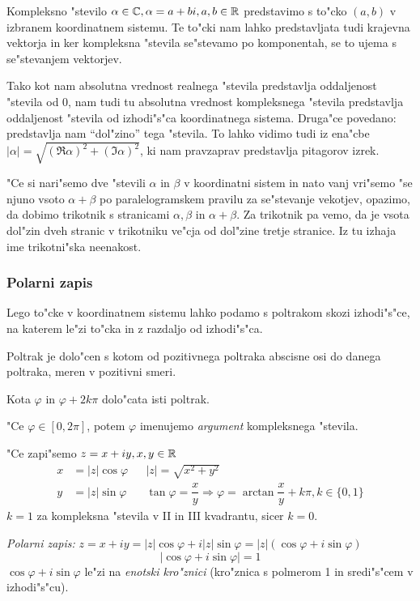 Kompleksno "stevilo $\alpha \in \mathbb{C}, \alpha = a + bi, a, b \in \mathbb{R}$ predstavimo s to"cko $(a, b)$ v izbranem koordinatnem sistemu. Te to"cki nam lahko predstavljata tudi krajevna vektorja in ker kompleksna "stevila se"stevamo po komponentah, se to ujema s se"stevanjem vektorjev.

Tako kot nam absolutna vrednost realnega "stevila predstavlja oddaljenost "stevila od 0, nam tudi tu absolutna vrednost kompleksnega "stevila predstavlja oddaljenost "stevila od izhodi"s"ca koordinatnega sistema. Druga"ce povedano: predstavlja nam ``dol"zino'' tega "stevila. To lahko vidimo tudi iz ena"cbe $|\alpha| = \sqrt{(\Re\alpha)^2 + (\Im \alpha)^2}$, ki nam pravzaprav predstavlja pitagorov izrek.

"Ce si nari"semo dve "stevili $\alpha$ in $\beta$ v koordinatni sistem in nato vanj vri"semo "se njuno vsoto $\alpha + \beta$ po paralelogramskem pravilu za se"stevanje vekotjev, opazimo, da dobimo trikotnik s stranicami $\alpha, \beta$ in $\alpha + \beta$. Za trikotnik pa vemo, da je vsota dol"zin dveh stranic v trikotniku ve"cja od dol"zine tretje stranice. Iz tu izhaja ime trikotni"ska neenakost.

\subsubsection{Polarni zapis}
Lego to"cke v koordinatnem sistemu lahko podamo s poltrakom skozi izhodi"s"ce, na katerem le"zi to"cka in z razdaljo od izhodi"s"ca.

Poltrak je dolo"cen s kotom od pozitivnega poltraka abscisne osi do danega poltraka, meren v pozitivni smeri.

Kota $\varphi$ in $\varphi + 2k\pi$ dolo"cata isti poltrak.

"Ce $\varphi \in [0, 2\pi]$, potem $\varphi$ imenujemo \emph{argument} kompleksnega "stevila.

"Ce zapi"semo $z = x + iy, x, y \in \mathbb{R}$
\begin{align*}
x &= |z| \cos \varphi && |z| = \sqrt{x^2 + y^2}\\
y & = |z| \sin \varphi && \tan \varphi = \dfrac{x}{y} \Rightarrow \varphi = \arctan \dfrac{x}{y} + k\pi, k \in \{0, 1\}
\end{align*}
$k = 1$ za kompleksna "stevila v II in III  kvadrantu, sicer $k = 0$.

\emph{Polarni zapis:} $z = x + iy = |z|\cos \varphi + i|z|\sin \varphi = |z|(\cos \varphi + i\sin \varphi)$
\begin{equation*}
|\cos \varphi + i\sin \varphi| = 1
\end{equation*}
$\cos \varphi + i\sin \varphi$ le"zi na \emph{enotski kro"znici} (kro"znica s polmerom 1 in sredi"s"cem v izhodi"s"cu).

